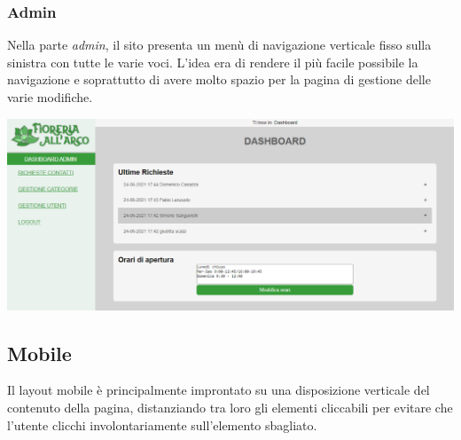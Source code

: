 \subsubsection{Admin}
Nella parte \textit{admin}, il sito presenta un menù di navigazione verticale fisso sulla sinistra con tutte le varie voci. L'idea era di rendere il più facile possibile la navigazione e soprattutto di avere molto spazio per la pagina di gestione delle varie modifiche.
\begin{center}
\includegraphics[scale = 0.4]{../latex/images/desktopadmin.png}\\[0.5cm]
\end{center}
\subsection{Mobile}
Il layout mobile è principalmente improntato su una disposizione verticale del contenuto della pagina, distanziando tra loro gli elementi cliccabili per evitare che l'utente clicchi involontariamente sull'elemento sbagliato. 
